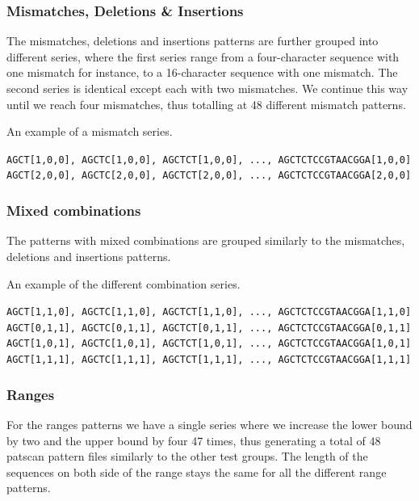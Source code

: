 \documentclass[12pt]{article}
\theoremstyle{definition}
\begin{document}
\subsubsection{Mismatches, Deletions \& Insertions}
The mismatches, deletions and insertions patterns are further grouped into different series, where the first series range from a four-character sequence with one mismatch for instance, to a 16-character sequence with one mismatch. The second series is identical except each with two mismatches. We continue this way until we reach four mismatches, thus totalling at 48 different mismatch patterns.

\begin{example}
An example of a mismatch series.

\begin{center}
\texttt{AGCT[1,0,0], AGCTC[1,0,0], AGCTCT[1,0,0], ..., AGCTCTCCGTAACGGA[1,0,0]
AGCT[2,0,0], AGCTC[2,0,0], AGCTCT[2,0,0], ..., AGCTCTCCGTAACGGA[2,0,0]
}
\end{center}
\end{example}

\subsubsection{Mixed combinations}
The patterns with mixed combinations are grouped similarly to the mismatches, deletions and insertions patterns.

\begin{example}
An example of the different combination series.

\begin{center}
\texttt{AGCT[1,1,0], AGCTC[1,1,0], AGCTCT[1,1,0], ..., AGCTCTCCGTAACGGA[1,1,0]
AGCT[0,1,1], AGCTC[0,1,1], AGCTCT[0,1,1], ..., AGCTCTCCGTAACGGA[0,1,1]
AGCT[1,0,1], AGCTC[1,0,1], AGCTCT[1,0,1], ..., AGCTCTCCGTAACGGA[1,0,1]
AGCT[1,1,1], AGCTC[1,1,1], AGCTCT[1,1,1], ..., AGCTCTCCGTAACGGA[1,1,1]
}
\end{center}

\end{example}

\subsubsection{Ranges}

For the ranges patterns we have a single series where we increase the lower bound by two and the upper bound by four 47 times, thus generating a total of 48 patscan pattern files similarly to the other test groups. The length of the sequences on both side of the range stays the same for all the different range patterns.
\end{document}
